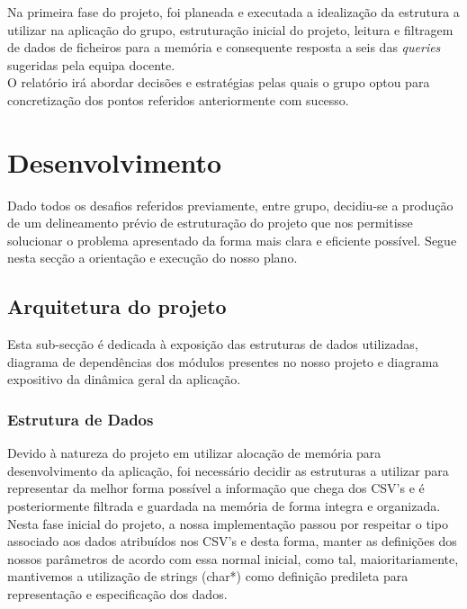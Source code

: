 \documentclass[12pt,a4paper]{article}
\begin{document}
    Na primeira fase do projeto, foi planeada e executada a idealização da estrutura a utilizar na aplicação do grupo, estruturação inicial do projeto, leitura e filtragem de dados de ficheiros para a memória e consequente resposta a seis das \textit{queries} sugeridas pela equipa docente.\\
        
    O relatório irá abordar decisões e estratégias pelas quais o grupo optou para concretização dos pontos referidos anteriormente com sucesso.
         
    \section{Desenvolvimento}
    \hspace{0,6cm}Dado todos os desafios referidos previamente, entre grupo, decidiu-se a produção de um delineamento prévio de estruturação do projeto que nos permitisse solucionar o problema apresentado da forma mais clara e eficiente possível. Segue nesta secção a orientação e execução do nosso plano.  

    \subsection{Arquitetura do projeto}

    \hspace{0,6cm}Esta sub-secção é dedicada à exposição das estruturas de dados utilizadas, diagrama de dependências dos módulos presentes no nosso projeto e diagrama expositivo da dinâmica geral da aplicação.
    
    \subsubsection{Estrutura de Dados}

    \hspace{0,6cm}Devido à natureza do projeto em utilizar alocação de memória para desenvolvimento da aplicação, foi necessário decidir as estruturas a utilizar para representar da melhor forma possível a informação que chega dos CSV's e é posteriormente filtrada e guardada na memória de forma integra e organizada. \\

    Nesta fase inicial do projeto, a nossa implementação passou por respeitar o tipo associado aos dados atribuídos nos CSV's e desta forma, manter as definições dos nossos parâmetros de acordo com essa normal inicial, como tal, maioritariamente, mantivemos a utilização de strings (char*) como definição predileta para representação e especificação dos dados.\\
\end{document}

